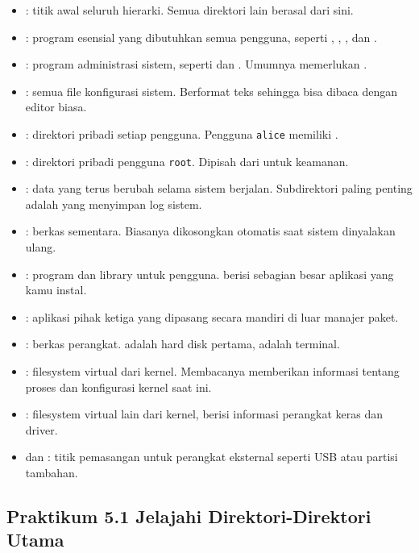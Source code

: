 \begin{itemize}
    \item \dir{/} : titik awal seluruh hierarki. Semua direktori lain berasal dari sini.
    \item {} : program esensial yang dibutuhkan semua pengguna, seperti , , , dan .
    \item {} : program administrasi sistem, seperti  dan . Umumnya memerlukan .
    \item {} : semua file konfigurasi sistem. Berformat teks sehingga bisa dibaca dengan editor biasa.
    \item {} : direktori pribadi setiap pengguna. Pengguna \texttt{alice} memiliki .
    \item {} : direktori pribadi pengguna \texttt{root}. Dipisah dari  untuk keamanan.
    \item {} : data yang terus berubah selama sistem berjalan. Subdirektori paling penting adalah  yang menyimpan log sistem.
    \item {} : berkas sementara. Biasanya dikosongkan otomatis saat sistem dinyalakan ulang.
    \item {} : program dan library untuk pengguna.  berisi sebagian besar aplikasi yang kamu instal.
    \item {} : aplikasi pihak ketiga yang dipasang secara mandiri di luar manajer paket.
    \item {} : berkas perangkat.  adalah hard disk pertama,  adalah terminal.
    \item {} : filesystem virtual dari kernel. Membacanya memberikan informasi tentang proses dan konfigurasi kernel saat ini.
    \item {} : filesystem virtual lain dari kernel, berisi informasi perangkat keras dan driver.
    \item {} dan  : titik pemasangan untuk perangkat eksternal seperti USB atau partisi tambahan.
\end{itemize}

\subsection*{Praktikum 5.1 Jelajahi Direktori-Direktori Utama}

